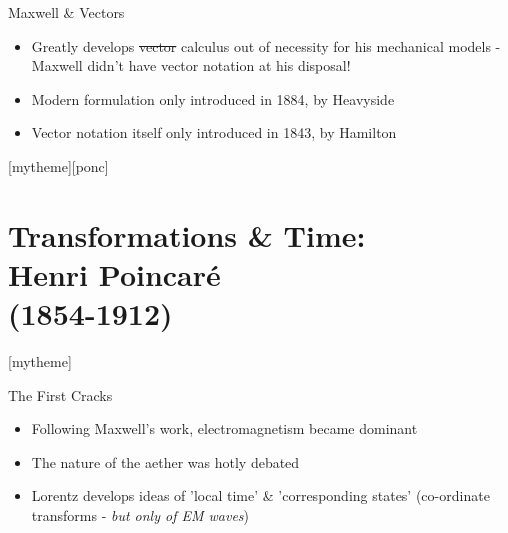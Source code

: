 \documentclass{beamer}
\newcommand{\sectionpic}[2]{
   \setbeamertemplate{section page}[mytheme][#2]
   \section{#1}
   \setbeamertemplate{section page}[mytheme]
}
\newcommand{\customfootnotetext}[2]{{
\renewcommand{\thefootnote}{#1}
\footnotetext[0]{#2}}}
\begin{document}
\begin{frame}{Maxwell \& Vectors}
	\begin{itemize}
		\item Greatly develops \sout{vector} calculus out of necessity for his mechanical models {\color{mEm}- Maxwell didn't have vector notation at his disposal!}
		\item Modern formulation only introduced in 1884, by Heavyside{ \autocite{heavyside}}
		\item Vector notation itself only introduced in 1843, by Hamilton \autocite{vecanal}
	\end{itemize}
\end{frame}
  \sectionpic{Transformations \& Time:\\Henri Poincaré\\\scriptsize{(1854-1912)}}{ponc}
\begin{frame}{The First Cracks}
\begin{itemize}
	\item Following Maxwell's work, electromagnetism became dominant{ \autocite{maxwellians}}
	\item  The nature of the aether was hotly debated
	\item Lorentz develops ideas of 'local time' \& 'corresponding states' (co-ordinate transforms - \emph{but only of EM waves}\autocite{brownspec})
\end{itemize}
\end{frame}
\end{document}
